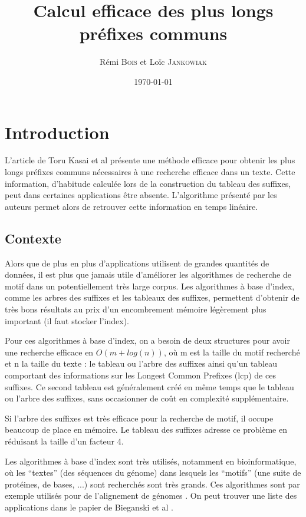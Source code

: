 \documentclass[a4paper,10pt]{article}
\title{Calcul efficace des plus longs préfixes communs}
\author{Rémi \textsc{Bois} et Loïc \textsc{Jankowiak}}
\date{\today}
\begin{document}
\maketitle


\section{Introduction}
\label{sec:intro}

L'article de Toru Kasai et al \cite{Kasai01} présente une méthode efficace pour
obtenir les plus longs préfixes communs nécessaires à une recherche
efficace dans un texte. Cette information, d'habitude calculée lors de
la construction du tableau des suffixes, peut dans certaines
applications être absente. L'algorithme présenté par les auteurs
permet alors de retrouver cette information en temps linéaire.


\subsection{Contexte}
\label{sec:context}

Alors que de plus en plus d'applications utilisent de grandes
quantités de données, il est plus que jamais utile d'améliorer les
algorithmes de recherche de motif dans un potentiellement très large
corpus. Les algorithmes à base d'index, comme les arbres des suffixes
et les tableaux des suffixes, permettent d'obtenir de très bons
résultats au prix d'un encombrement mémoire légèrement plus important
(il faut stocker l'index).

Pour ces algorithmes à base d'index, on a besoin de deux structures
pour avoir une recherche efficace en $O(m+ log(n))$, où m est la
taille du motif recherché et n la taille du texte : le tableau ou
l'arbre des suffixes ainsi qu'un tableau comportant des informations
sur les Longest Common Prefixes (lcp) de ces suffixes. Ce second
tableau est généralement créé en même temps que le tableau ou l'arbre des
suffixes, sans occasionner de coût en complexité supplémentaire.

Si l'arbre des suffixes est très efficace pour la recherche de motif,
il occupe beaucoup de place en mémoire. Le tableau des suffixes
adresse ce problème en réduisant la taille d'un facteur 4.

Les algorithmes à base d'index sont très utilisés, notamment en
bioinformatique, où les ``textes'' (des séquences du génome) dans
lesquels les ``motifs'' (une suite de protéines, de bases, ...) sont
recherchés sont très grands. Ces algorithmes sont par exemple utilisés
pour de l'alignement de génomes \cite{Kurtz04}. On peut trouver une
liste des applications dans le papier de Bieganski et al \cite{Bieganski94}.
\end{document}
